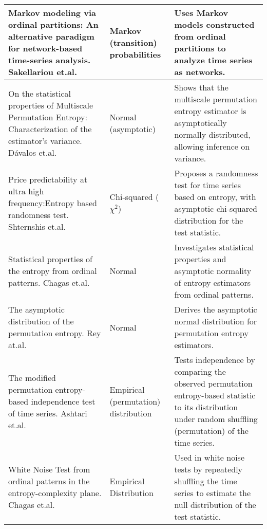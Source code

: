\begin{longtable}{|p{5.5cm}|p{2.5cm}|p{6.5cm}|}
	\hline
	Markov modeling via ordinal partitions: An alternative paradigm for network-based time-series analysis. Sakellariou et.al.~\cite{Sakellariou2019} & Markov (transition) probabilities & Uses Markov models constructed from ordinal partitions to analyze time series as networks. \\
	\hline
	On the statistical properties of Multiscale Permutation Entropy: Characterization of the estimator's variance. Dávalos et.al.~\cite{Davalos2019a} & Normal (asymptotic) & Shows that the multiscale permutation entropy estimator is asymptotically normally distributed, allowing inference on variance.\\
	\hline
	Price predictability at ultra high frequency:Entropy based randomness test. Shternshis et.al.~\cite{Shternshis2025}& Chi-squared ($\chi^2$) & Proposes a randomness test for time series based on entropy, with asymptotic chi-squared distribution for the test statistic. \\
	\hline
	Statistical properties of the entropy from ordinal patterns. Chagas et.al.~\cite{Chagas2022} & Normal & Investigates statistical properties and asymptotic normality of entropy estimators from ordinal patterns. \\
	\hline
	The asymptotic distribution of the permutation entropy. Rey at.al.~\cite{Rey2023a} & Normal & Derives the asymptotic normal distribution for permutation entropy estimators. \\
	\hline
	The modified permutation entropy-based independence test of time series. Ashtari et.al.~\cite{AshtariNezhad2019} & Empirical (permutation) distribution & Tests independence by comparing the observed permutation entropy-based statistic to its distribution under random shuffling (permutation) of the time series.\\
	\hline
	White Noise Test from ordinal patterns in the entropy-complexity plane. Chagas et.al.~\cite{Chagas2022a} & Empirical Distribution & Used in white noise tests by repeatedly shuffling the time series to estimate the null distribution of the test statistic.\\
	\hline
	
\end{longtable}

	
	






